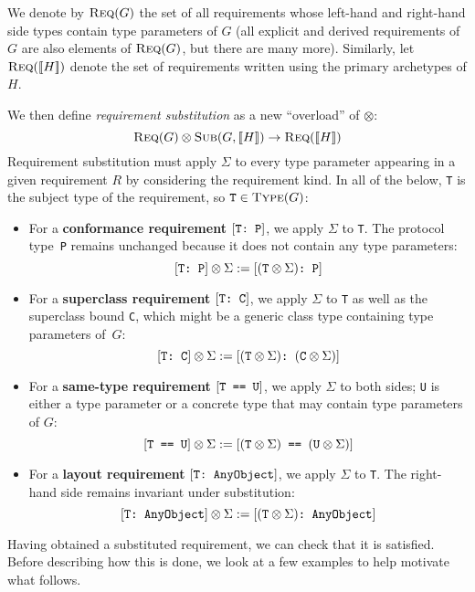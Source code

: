 \documentclass[../generics]{subfiles}
\begin{document}
\begin{definition}
We denote by $\textsc{Req}({G})$ the set of all requirements whose left-hand and right-hand side types contain type parameters of $G$ (all explicit and derived requirements of $G$ are also elements of $\textsc{Req}({G})$, but there are many more). Similarly, let $\textsc{Req}({[\![H]\!]})$ denote the set of requirements written using the primary archetypes of $H$.

We then define \emph{requirement substitution} as a new ``overload'' of \index{$\otimes$}$\otimes$:
\[\textsc{Req}({G})\otimes\textsc{Sub}({G, [\![H]\!]})\rightarrow\textsc{Req}({[\![H]\!]})\]
Requirement substitution must apply $\Sigma$ to every type parameter appearing in a given requirement $R$ by considering the requirement kind. In all of the below, \texttt{T} is the subject type of the requirement, so $\texttt{T}\in\textsc{Type}({G})$:
\begin{itemize}
\item For a \textbf{conformance requirement} $[\texttt{T:~P}]$, we apply $\Sigma$ to \texttt{T}. The protocol type~\texttt{P} remains unchanged because it does not contain any type parameters:
\[[\texttt{T:~P}]\otimes\Sigma:=[\texttt{$(\texttt{T}\otimes\Sigma)$:~P}]\]

\item For a \textbf{superclass requirement} $[\texttt{T:~C}]$, we apply $\Sigma$ to \texttt{T} as well as the superclass bound \texttt{C}, which might be a generic class type containing type parameters of~$G$:
\[[\texttt{T:~C}]\otimes\Sigma:=[\texttt{$(\texttt{T}\otimes\Sigma)$:~$(\texttt{C}\otimes\Sigma)$}]\]

\item For a \textbf{same-type requirement} $[\texttt{T == U}]$, we apply $\Sigma$ to both sides; \texttt{U} is either a type parameter or a concrete type that may contain type parameters of $G$:
\[[\texttt{T == U}]\otimes\Sigma:=[\texttt{$(\texttt{T}\otimes\Sigma)$ == $(\texttt{U}\otimes\Sigma)$}]\]

\item For a \textbf{layout requirement} $[\texttt{T:~AnyObject}]$, we apply $\Sigma$ to \texttt{T}. The right-hand side remains invariant under substitution:
\[[\texttt{T:~AnyObject}]\otimes\Sigma:=[\texttt{$(\texttt{T}\otimes\Sigma)$:~AnyObject}]\]
\end{itemize}
Having obtained a substituted requirement, we can check that it is satisfied. Before describing how this is done, we look at a few examples to help motivate what follows.
\end{definition}
\end{document}
